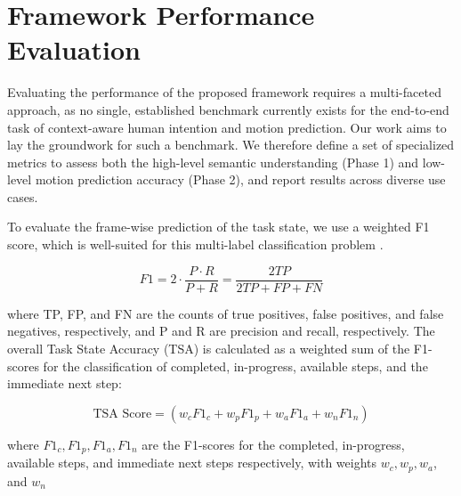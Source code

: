 \documentclass[biomimetics,article,submit,pdftex,moreauthors]{Definitions/mdpi}
\begin{document}
\section{Framework Performance Evaluation}
\label{sec:eval}
Evaluating the performance of the proposed framework requires a multi-faceted approach, as no single, established benchmark currently exists for the end-to-end task of context-aware human intention and motion prediction. Our work aims to lay the groundwork for such a benchmark. We therefore define a set of specialized metrics to assess both the high-level semantic understanding (Phase 1) and low-level motion prediction accuracy (Phase 2), and report results across diverse use cases.

To evaluate the frame-wise prediction of the task state, we use a weighted F1 score, which is well-suited for this multi-label classification problem  \citep{F1ref}.

\begin{linenomath}
\begin{equation}
    F1 = 2 \cdot \frac{P \cdot R}{P + R} = \frac{2TP}{2TP + FP + FN}
\end{equation}
\end{linenomath}

where TP, FP, and FN are the counts of true positives, false positives, and false negatives, respectively, and P and R are precision and recall, respectively. The overall Task State Accuracy (TSA) is calculated as a weighted sum of the F1-scores for the classification of completed, in-progress, available steps, and the immediate next step:

\begin{linenomath}
\begin{equation}
\text{TSA Score} = (w_c F1_c + w_p F1_p + w_a F1_a+w_nF1_n) 
\end{equation}
\end{linenomath}

where $F1_c, F1_p, F1_a, F1_n$ are the F1-scores for the completed, in-progress, available steps, and immediate next steps respectively, with weights $w_c, w_p, w_a$, and $w_n$ 
\end{document}

